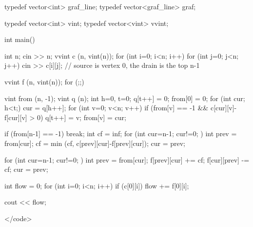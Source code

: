 typedef vector<int> graf_line;
typedef vector<graf_line> graf;

typedef vector<int> vint;
typedef vector<vint> vvint;


int main()
{
int n;
cin >> n;
vvint c (n, vint(n));
for (int i=0; i<n; i++)
for (int j=0; j<n; j++)
cin >> c[i][j];
// source is vertex 0, the drain is the top n-1

vvint f (n, vint(n));
for (;;)
{

vint from (n, -1);
vint q (n);
int h=0, t=0;
q[t++] = 0;
from[0] = 0;
for (int cur; h<t;)
{
cur = q[h++];
for (int v=0; v<n; v++)
if (from[v] == -1 &&
c[cur][v]-f[cur][v] > 0)
{
q[t++] = v;
from[v] = cur;
}
}

if (from[n-1] == -1)
break;
int cf = inf;
for (int cur=n-1; cur!=0; )
{
int prev = from[cur];
cf = min (cf, c[prev][cur]-f[prev][cur]);
cur = prev;
}

for (int cur=n-1; cur!=0; )
{
int prev = from[cur];
f[prev][cur] += cf;
f[cur][prev] -= cf;
cur = prev;
}

}

int flow = 0;
for (int i=0; i<n; i++)
if (c[0][i])
flow += f[0][i];

cout << flow;

}</code>